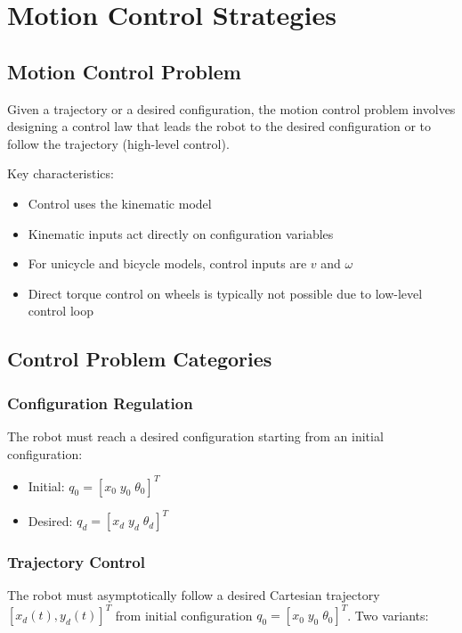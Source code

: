 \documentclass[openany]{book}
\theoremstyle{definition}
\theoremstyle{remark}
\newcommand{\definitionbox}[1]{
\begin{tcolorbox}[colback=blue!5,colframe=blue!40!black,title=Definition]
 #1
\end{tcolorbox}
}
\begin{document}
\chapter{Motion Control Strategies}

\section{Motion Control Problem}

\definitionbox{Given a trajectory or a desired configuration, the motion control problem involves designing a control law that leads the robot to the desired configuration or to follow the trajectory (high-level control).}

Key characteristics:
\begin{itemize}
    \item Control uses the kinematic model
    \item Kinematic inputs act directly on configuration variables
    \item For unicycle and bicycle models, control inputs are $v$ and $\omega$
    \item Direct torque control on wheels is typically not possible due to low-level control loop
\end{itemize}

\section{Control Problem Categories}

\subsection{Configuration Regulation}
The robot must reach a desired configuration starting from an initial configuration:
\begin{itemize}
    \item Initial: $q_0 = [x_0 \; y_0 \; \theta_0]^T$
    \item Desired: $q_d = [x_d \; y_d \; \theta_d]^T$
\end{itemize}

\subsection{Trajectory Control}
The robot must asymptotically follow a desired Cartesian trajectory $[x_d(t), y_d(t)]^T$ from initial configuration $q_0 = [x_0 \; y_0 \; \theta_0]^T$. Two variants:
\end{document}
